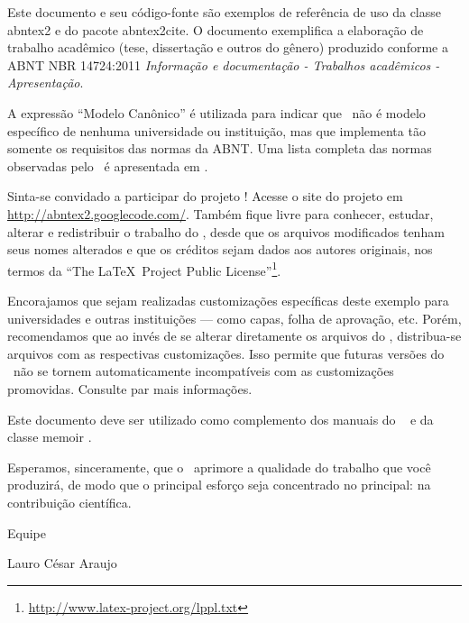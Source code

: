 \documentclass[
12pt,				%
openright,			%
twoside,			%
a4paper,			%
english,			%
french,				%
spanish,			%
brazil				%
]{abntex2}
\begin{document}
        Este documento e seu código-fonte são exemplos de referência de uso da classe
        \textsf{abntex2} e do pacote \textsf{abntex2cite}. O documento 
        exemplifica a elaboração de trabalho acadêmico (tese, dissertação e outros do
        gênero) produzido conforme a ABNT NBR 14724:2011 \emph{Informação e documentação
            - Trabalhos acadêmicos - Apresentação}.
        
        A expressão ``Modelo Canônico'' é utilizada para indicar que \abnTeX\ não é
        modelo específico de nenhuma universidade ou instituição, mas que implementa tão
        somente os requisitos das normas da ABNT. Uma lista completa das normas
        observadas pelo \abnTeX\ é apresentada em .
        
        Sinta-se convidado a participar do projeto \abnTeX! Acesse o site do projeto em
        \url{http://abntex2.googlecode.com/}. Também fique livre para conhecer,
        estudar, alterar e redistribuir o trabalho do \abnTeX, desde que os arquivos
        modificados tenham seus nomes alterados e que os créditos sejam dados aos
        autores originais, nos termos da ``The \LaTeX\ Project Public
        License''\footnote{\url{http://www.latex-project.org/lppl.txt}}.
        
        Encorajamos que sejam realizadas customizações específicas deste exemplo para
        universidades e outras instituições --- como capas, folha de aprovação, etc.
        Porém, recomendamos que ao invés de se alterar diretamente os arquivos do
        \abnTeX, distribua-se arquivos com as respectivas customizações.
        Isso permite que futuras versões do \abnTeX~não se tornem automaticamente
        incompatíveis com as customizações promovidas. Consulte
         par mais informações.
        
        Este documento deve ser utilizado como complemento dos manuais do \abnTeX\ 
        \cite{abntex2classe,abntex2cite,abntex2cite-alf} e da classe \textsf{memoir}
        \cite{memoir}. 
        
        Esperamos, sinceramente, que o \abnTeX\ aprimore a qualidade do trabalho que
        você produzirá, de modo que o principal esforço seja concentrado no principal:
        na contribuição científica.
        
        Equipe \abnTeX 
        
        Lauro César Araujo
        
\end{document}
